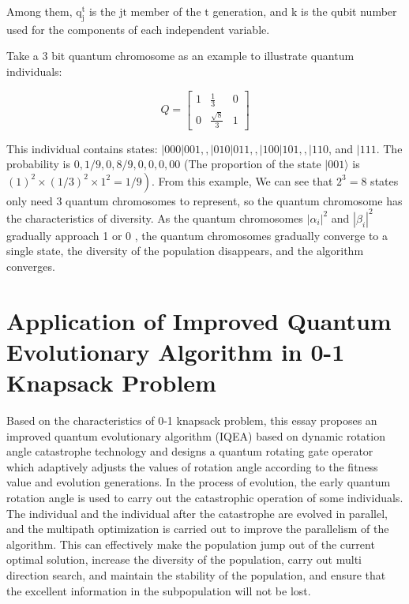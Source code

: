 \documentclass[10pt]{article}
\begin{document}
Among them, $\mathrm{q}_{\mathrm{j}}^{\mathrm{t}}$ is the $\mathrm{jt}$ member of the $\mathrm{t}$ generation, and $\mathrm{k}$ is the qubit number used for the components of each independent variable.

Take a 3 bit quantum chromosome as an example to illustrate quantum individuals:

$$
Q=\left[\begin{array}{c|c|c}
1 & \frac{1}{3} & 0 \\
0 & \frac{\sqrt{8}}{3} & 1
\end{array}\right]
$$

This individual contains states: $|000| 001,,|010| 011,,|100| 101,, \mid 110$, and $\mid 111$. The probability is $0,1 / 9,0,8 / 9,0,0,0,00$ (The proportion of the state $|001\rangle$ is $\left.(1)^{2} \times(1 / 3)^{2} \times 1^{2}=1 / 9\right)$. From this example, We can see that $2^{3}=8$ states only need 3 quantum chromosomes to represent, so the quantum chromosome has the characteristics of diversity. As the quantum chromosomes $\left|\alpha_{i}\right|^{2}$ and $\left|\beta_{i}\right|^{2}$ gradually approach 1 or 0 , the quantum chromosomes gradually converge to a single state, the diversity of the population disappears, and the algorithm converges.

\section{Application of Improved Quantum Evolutionary Algorithm in 0-1 Knapsack Problem}
Based on the characteristics of 0-1 knapsack problem, this essay proposes an improved quantum evolutionary algorithm (IQEA) based on dynamic rotation angle catastrophe technology and designs a quantum rotating gate operator which adaptively adjusts the values of rotation angle according to the fitness value and evolution generations. In the process of evolution, the early quantum rotation angle is used to carry out the catastrophic operation of some individuals. The individual and the individual after the catastrophe are evolved in parallel, and the multipath optimization is carried out to improve the parallelism of the algorithm. This can effectively make the population jump out of the current optimal solution, increase the diversity of the population, carry out multi direction search, and maintain the stability of the population, and ensure that the excellent information in the subpopulation will not be lost.
\end{document}

